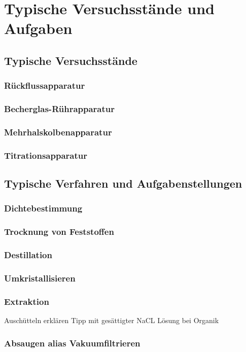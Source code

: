 \section{Typische Versuchsstände und Aufgaben}

\subsection{Typische Versuchsstände}
\subsubsection*{Rückflussapparatur}
\subsubsection*{Becherglas-Rührapparatur}
\subsubsection*{Mehrhalskolbenapparatur}
\subsubsection{Titrationsapparatur}

\subsection{Typische Verfahren und Aufgabenstellungen}
\subsubsection{Dichtebestimmung}
\subsubsection{Trocknung von Feststoffen}
\subsubsection{Destillation}
\subsubsection{Umkristallisieren}
\subsubsection{Extraktion}
\label{sec:extraktion}
Auschütteln erklären
Tipp mit gesättigter NaCL Lösung bei Organik
\subsubsection{Absaugen alias Vakuumfiltrieren}

